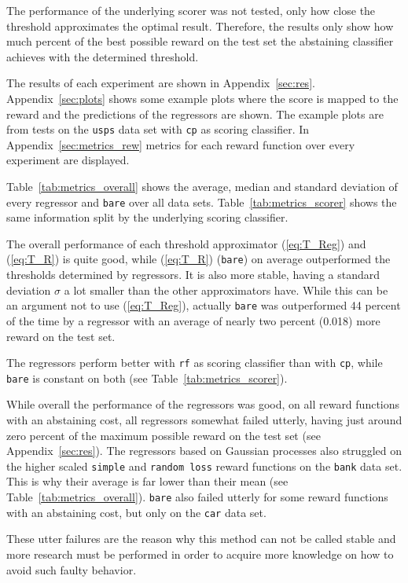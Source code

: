 \documentclass[twoside,11pt]{article}
\begin{document}
The performance of the underlying scorer was not tested,
only how close the threshold approximates the optimal
result. Therefore, the results only show how much percent
of the best possible reward on the test set the abstaining
classifier achieves with the determined threshold.

The results of each experiment are shown in
Appendix~\ref{sec:res}.
Appendix~\ref{sec:plots} shows some example plots where the
score is mapped to the reward and the predictions of the
regressors are shown.
The example plots are from tests on the \texttt{usps} data
set with \texttt{cp} as scoring classifier.
In Appendix~\ref{sec:metrics_rew} metrics for each reward
function over every experiment are displayed.

Table~\ref{tab:metrics_overall} shows the average, median
and standard deviation of every regressor and \texttt{bare}
over all data sets.
Table~\ref{tab:metrics_scorer} shows the same information
split by the underlying scoring classifier.

The overall performance of each threshold approximator
(\ref{eq:T_Reg}) and (\ref{eq:T_R}) is quite good,
while (\ref{eq:T_R}) (\texttt{bare}) on average
outperformed the thresholds determined by regressors.
It is also more stable, having a standard deviation
$\sigma$ a lot smaller than the other approximators have.
While this can be an argument not to use (\ref{eq:T_Reg}),
actually \texttt{bare} was outperformed 44 percent of the
time by a regressor with an average of nearly two percent
(0.018) more reward on the test set.

The regressors perform better with \texttt{rf} as scoring
classifier than with \texttt{cp}, while \texttt{bare} is
constant on both (see Table~\ref{tab:metrics_scorer}).

While overall the performance of the regressors was
good, on all reward functions with an abstaining cost,
all regressors somewhat failed utterly, having just around
zero percent of the maximum possible reward on the test
set (see Appendix~\ref{sec:res}).
The regressors based on Gaussian processes also struggled
on the higher scaled \texttt{simple} and
\texttt{random loss} reward functions on the \texttt{bank}
data set.
This is why their average is far lower than their mean
(see Table~\ref{tab:metrics_overall}).
\texttt{bare} also failed utterly for some reward functions
with an abstaining cost, but only on the \texttt{car} data
set.



These utter failures are the reason why this method can not
be called stable and more research must be performed in
order to acquire more knowledge on how to avoid such faulty
behavior.
\end{document}
